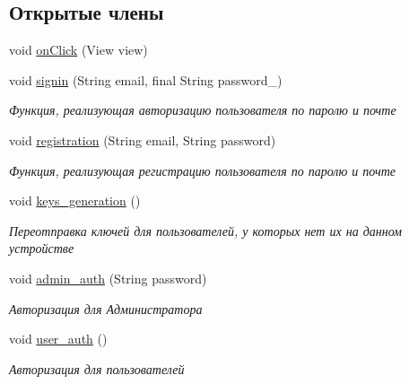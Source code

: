 \subsection*{Открытые члены}
\begin{DoxyCompactItemize}
\item 
void \mbox{\hyperlink{classcom_1_1example_1_1firebasechat_1_1_main_activity_a859bd2e4eca1bcc5b64414f3fae8dfd5}{on\+Click}} (View view)
\item 
void \mbox{\hyperlink{classcom_1_1example_1_1firebasechat_1_1_main_activity_ab05b9f3c667fd2a59b127fdf24f7af8f}{signin}} (String email, final String password\+\_\+)
\begin{DoxyCompactList}\small\item\em Функция, реализующая авторизацию пользователя по паролю и почте \end{DoxyCompactList}\item 
void \mbox{\hyperlink{classcom_1_1example_1_1firebasechat_1_1_main_activity_a95140ec9da54a87bc49b6ba1023cb8bd}{registration}} (String email, String password)
\begin{DoxyCompactList}\small\item\em Функция, реализующая регистрацию пользователя по паролю и почте \end{DoxyCompactList}\item 
void \mbox{\hyperlink{classcom_1_1example_1_1firebasechat_1_1_main_activity_a61ce1168261dbdab070cb0497ad845eb}{keys\+\_\+generation}} ()
\begin{DoxyCompactList}\small\item\em Переотправка ключей для пользователей, у которых нет их на данном устройстве \end{DoxyCompactList}\item 
void \mbox{\hyperlink{classcom_1_1example_1_1firebasechat_1_1_main_activity_abca69f1465f860b8f9eedaa3b360201d}{admin\+\_\+auth}} (String password)
\begin{DoxyCompactList}\small\item\em Авторизация для Администратора \end{DoxyCompactList}\item 
void \mbox{\hyperlink{classcom_1_1example_1_1firebasechat_1_1_main_activity_a4cc4577677e01c9c0898ab0aaa07d670}{user\+\_\+auth}} ()
\begin{DoxyCompactList}\small\item\em Авторизация для пользователей \end{DoxyCompactList}\end{DoxyCompactItemize}
